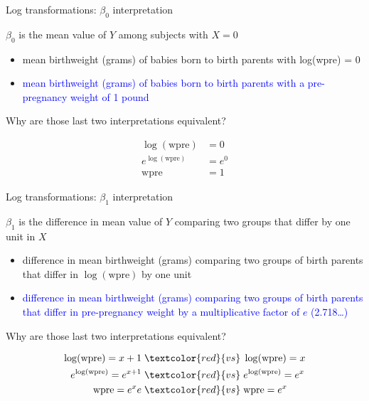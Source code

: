 \documentclass[10pt,t]{beamer}
\begin{document}
\begin{frame}{Log transformations: $\beta_0$ interpretation}

$\beta_0$ is the mean value of $Y$ among subjects with $X = 0$

\begin{itemize}
	\item[] mean birthweight (grams) of babies born to birth parents with log(wpre) = 0
	\item[] \textcolor{blue}{mean birthweight (grams) of babies born to birth parents with a pre-pregnancy weight of 1 pound}
\end{itemize}

\vspace{0.3cm}


Why are those last two interpretations equivalent?


\begin{align*}
\log(\text{wpre}) & = 0 \\
e^{\log(\text{wpre})} & = e^0 \\
\text{wpre} & = 1
\end{align*}

\end{frame}


\begin{frame}{Log transformations: $\beta_1$ interpretation}

$\beta_1$ is the difference in mean value of $Y$ comparing two groups that differ by one unit in $X$\pause

\begin{itemize}
	\item[] difference in mean birthweight (grams) comparing two groups of birth parents that differ in $\log(\text{wpre})$ by one unit \pause
	\item[] \textcolor{blue}{difference in mean birthweight (grams) comparing two groups of birth parents that differ in pre-pregnancy weight by a multiplicative factor of $e$ (2.718\dots)}
\end{itemize} \pause

\vspace{0.3cm}


Why are those last two interpretations equivalent?


\begin{align*}
\log(\text{wpre})  = x + 1 \hspace{0.1cm} & \textcolor{red}{vs} \hspace{0.1cm} \log(\text{wpre})  = x  \\
e^{\log(\text{wpre})}  = e^{x + 1}  \hspace{0.1cm} & \textcolor{red}{vs} \hspace{0.1cm} e^{\log(\text{wpre})}  = e^{x}\\
\text{wpre}  = e^x e \hspace{0.1cm} & \textcolor{red}{vs} \hspace{0.1cm} \text{wpre} = e^x
\end{align*}

\end{frame}
\end{document}
